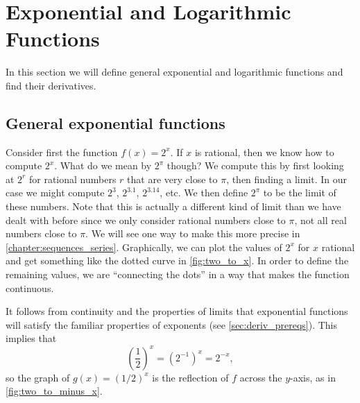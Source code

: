 \section{Exponential and Logarithmic Functions}\label{sec:exp_log}

In this section we will define general exponential and logarithmic functions and find their derivatives. 

\subsection{General exponential functions}

Consider first the function $f(x)=2^x$. If $x$ is rational, then we know how to compute $2^x$. What do we mean by $2^\pi$ though? We compute this by first looking at $2^r$ for rational numbers $r$ that are very close to $\pi$, then finding a limit. In our case we might compute $2^3$, $2^{3.1}$, $2^{3.14}$, etc. We then define $2^\pi$ to be the limit of these numbers. Note that this is actually a different kind of limit than we have dealt with before since we only consider rational numbers close to $\pi$, not all real numbers close to $\pi$. We will see one way to make this more precise in \autoref{chapter:sequences_series}. Graphically, we can plot the values of $2^x$ for $x$ rational and get something like the dotted curve in \autoref{fig:two_to_x}. In order to define the remaining values, we are ``connecting the dots'' in a way that makes the function continuous.

It follows from continuity and the properties of limits that exponential functions will satisfy the familiar properties of exponents (see \autoref{sec:deriv_prereqs}).  This implies that
\[\left(\frac12\right)^x =(2^{-1})^x=2^{-x},\]
so the graph of $g(x)=(1/2)^x$ is the reflection of $f$ across the $y$-axis, as in \autoref{fig:two_to_minus_x}.

